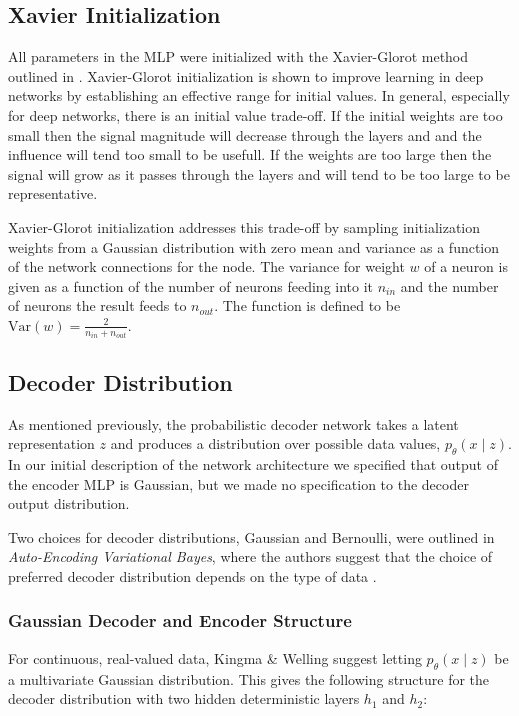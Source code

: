 \documentclass{article} %
\numberwithin{figure}{section}
\begin{document}
\subsection{Xavier Initialization}
All parameters in the MLP were initialized with the Xavier-Glorot method outlined in \cite{Glorot2010}. Xavier-Glorot initialization is shown to improve learning in deep networks by establishing an effective range for initial values. In general, especially for deep networks, there is an initial value trade-off. If the initial weights are too small then the signal magnitude will decrease through the layers and and the influence will tend too small to be usefull. If the weights are too large then the signal will grow as it passes through the layers and will tend to be too large to be representative.
\par Xavier-Glorot initialization addresses this trade-off by sampling initialization weights from a Gaussian distribution with zero mean and variance as a function of the network connections for the node. The variance for weight $w$  of a neuron is given as a function of the number of neurons feeding into it $n_{in}$ and the number of neurons the result feeds to $n_{out}$. The function is defined to be $\text{Var}(w) = \frac{2}{n_{in}+n_{out}}$.


\subsection{Decoder Distribution}
As mentioned previously, the probabilistic decoder network takes a latent representation $z$ and produces a distribution over possible data values, ${p_\theta(x\mid z)}$. In our initial description of the network architecture we specified that output of the encoder MLP is Gaussian, but we made no specification to the decoder output distribution.
\par Two choices for decoder distributions, Gaussian and Bernoulli, were outlined in \textit{Auto-Encoding Variational Bayes}, where the authors suggest that the choice of preferred decoder distribution depends on the type of data \cite{Kingma2013}. 

\subsubsection{Gaussian Decoder and Encoder Structure}
For continuous, real-valued data, Kingma \& Welling suggest letting ${p_\theta(x\mid z)}$ be a multivariate Gaussian distribution. This gives the following structure for the decoder distribution with two hidden deterministic layers $h_1$ and $h_2$:
\end{document}
